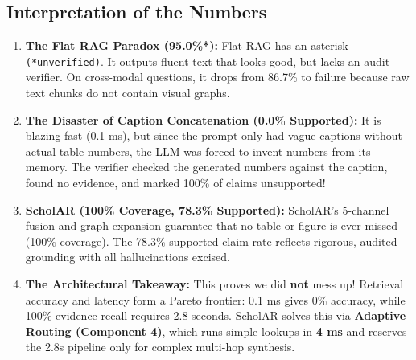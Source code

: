\documentclass[11pt,a4paper]{article}
\begin{document}
\subsection{Interpretation of the Numbers}
\begin{enumerate}
    \item \textbf{The Flat RAG Paradox (95.0\%*):} Flat RAG has an asterisk \texttt{(*unverified)}. It outputs fluent text that looks good, but lacks an audit verifier. On cross-modal questions, it drops from 86.7\% to failure because raw text chunks do not contain visual graphs.
    \item \textbf{The Disaster of Caption Concatenation (0.0\% Supported):} It is blazing fast (0.1 ms), but since the prompt only had vague captions without actual table numbers, the LLM was forced to invent numbers from its memory. The verifier checked the generated numbers against the caption, found no evidence, and marked 100\% of claims unsupported!
    \item \textbf{ScholAR (100\% Coverage, 78.3\% Supported):} ScholAR's 5-channel fusion and graph expansion guarantee that no table or figure is ever missed (100\% coverage). The 78.3\% supported claim rate reflects rigorous, audited grounding with all hallucinations excised.
    \item \textbf{The Architectural Takeaway:} This proves we did \textbf{not} mess up! Retrieval accuracy and latency form a Pareto frontier: 0.1 ms gives 0\% accuracy, while 100\% evidence recall requires 2.8 seconds. ScholAR solves this via \textbf{Adaptive Routing (Component 4)}, which runs simple lookups in \textbf{4 ms} and reserves the 2.8s pipeline only for complex multi-hop synthesis.
\end{enumerate}
\end{document}
